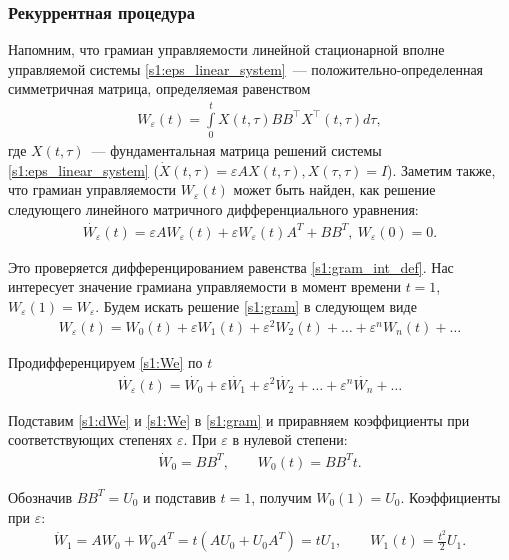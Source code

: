 \documentclass[../main.tex]{subfiles}
\begin{document}
\subsubsection{Рекуррентная процедура}
Напомним, что грамиан управляемости линейной стационарной вполне управляемой системы \eqref{s1:eps_linear_system}~--- положительно-определенная симметричная матрица, определяемая равенством
\begin{gather}\label{s1:gram_int_def}
 W_{\varepsilon}(t) = \int \limits_0^t X(t,\tau) B B^{\top} X^{\top}(t,\tau) d\tau,
\end{gather}
где $ X(t,\tau) $~--- фундаментальная матрица решений системы \eqref{s1:eps_linear_system} ($ \dot{X}(t,\tau) = \varepsilon A X(t,\tau), X(\tau,\tau) = I $).
Заметим также, что грамиан управляемости $ W_{\varepsilon}(t) $ может быть найден, как решение следующего линейного матричного дифференциального уравнения:
\begin{gather}\label{s1:gram}
 \dot{W_{\varepsilon}}(t) = \varepsilon A W_{\varepsilon}(t) + \varepsilon W_{\varepsilon}(t) A^T + BB^T, \ W_{\varepsilon}(0) = 0.
\end{gather}

Это проверяется дифференцированием равенства \eqref{s1:gram_int_def}.
Нас интересует значение грамиана управляемости в момент времени $ t = 1$, $ W_{\varepsilon}(1) = W_{\varepsilon}$.
Будем искать решение \eqref{s1:gram} в следующем виде
\begin{gather}\label{s1:We}
 W_{\varepsilon}(t) = W_0(t) + \varepsilon W_1(t) + \varepsilon^2 W_2(t) + \dots + \varepsilon^n W_n(t) + \dots 
\end{gather}
 
Продифференцируем \eqref{s1:We} по $ t $
\begin{gather}\label{s1:dWe}
 \dot{W_{\varepsilon}}(t) = \dot{W_0} + \varepsilon \dot{W_1} + \varepsilon^2 \dot{W_2} + \dots + \varepsilon^n \dot{W_n} + \dots 
\end{gather}
 
Подставим \eqref{s1:dWe} и \eqref{s1:We} в \eqref{s1:gram} и приравняем коэффициенты при соответствующих степенях $ \varepsilon $.
При $ \varepsilon $ в нулевой степени:
\begin{gather*}
 \dot{W}_0 = B B ^T, \qquad W_0(t) = B B ^Tt.
\end{gather*}
 
Обозначив $ B B^T = U_0 $ и подставив $ t = 1$, получим $ W_0(1) = U_0$.
Коэффициенты при $ \varepsilon$:
\begin{gather*}
 \dot{W}_1 = A W_0 + W_0 A^T = t \left( A U_0 + U_0 A^T \right) = t U_1, \qquad W_1(t) = \frac{t^2}{2}U_1.
\end{gather*}
 
\end{document}
